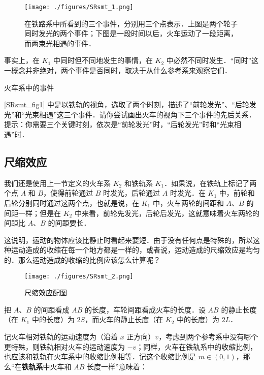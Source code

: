 \begin{figure}[ht]
\centering
\texttt{[image: ./figures/SRsmt\_1.png]}
\caption{在铁路系中所看到的三个事件，分别用三个点表示．上图是两个轮子同时发光的两个事件；下图是一段时间以后，火车运动了一段距离，而两束光相遇的事件．} \label{SRsmt_fig1}
\end{figure}

事实上，在 $K_1$ 中同时但不同地发生的事情，在 $K_2$ 中必然不同时发生．“同时”这一概念并非绝对，两个事件是否同时，取决于从什么参考系来观察它们．

\begin{exercise}{火车系中的事件}

\autoref{SRsmt_fig1} 中是以铁轨的视角，选取了两个时刻，描述了“前轮发光”、“后轮发光”和“光束相遇”这三个事件．请你尝试画出火车的视角下三个事件的先后关系．提示：你需要三个关键时刻，依次是“前轮发光”时，“后轮发光”时和“光束相遇”时．

\end{exercise}

\subsection{尺缩效应}

我们还是使用上一节定义的火车系 $K_2$ 和铁轨系 $K_1$．如果说，在铁轨上标记了两个点 $A$ 和 $B$，使得前轮通过 $B$ 时发光，后轮通过 $A$ 时发光．在 $K_1$ 中，前轮和后轮分别同时通过这两个点，也就是说，在 $K_1$ 中，火车两轮的间距和 $A$、$B$ 的间距一样；但是在 $K_2$ 中来看，前轮先发光，后轮后发光，这就意味着火车两轮的间距比 $A$、$B$ 的间距要长．

这说明，运动的物体应该比静止时看起来要短．由于没有任何点是特殊的，所以这种运动造成的收缩在每一个地方都是一样的，或者说，运动造成的尺缩效应是均匀的．那么运动造成的收缩的比例应该怎么计算呢？

\begin{figure}[ht]
\centering
\texttt{[image: ./figures/SRsmt\_2.png]}
\caption{尺缩效应配图} \label{SRsmt_fig2}
\end{figure}

把 $A$、$B$ 的间距看成 $AB$ 的长度，车轮间距看成火车的长度．设 $AB$ 的静止长度（在 $K_1$ 中的长度）为 $2S$，而火车的静止长度（在 $K_2$ 中的长度）为 $2L$．

记火车相对铁轨的运动速度为（沿着 $x$ 正方向）$v$，考虑到两个参考系中没有哪个更特殊，则铁轨相对火车的运动速度为 $-v$；同样，火车在铁轨系中的收缩比例，也应该和铁轨在火车系中的收缩比例相等．记这个收缩比例是 $m\in(0,1)$，那么“在\textbf{铁轨系}中火车和 $AB$ 长度一样”意味着：

